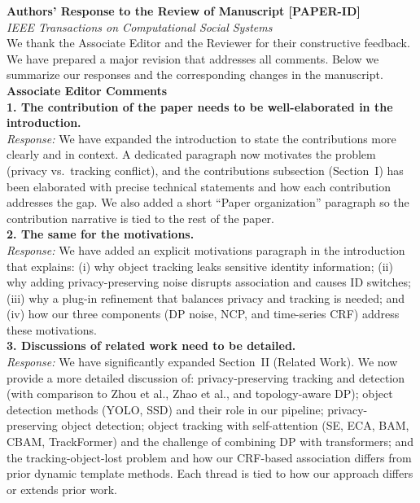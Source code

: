 \thispagestyle{plain}
\noindent\textbf{\large Authors' Response to the Review of Manuscript [PAPER-ID]}\\[0.5em]
\noindent\textit{IEEE Transactions on Computational Social Systems}\\

\vspace{0.5em}
\noindent We thank the Associate Editor and the Reviewer for their constructive feedback. We have prepared a major revision that addresses all comments. Below we summarize our responses and the corresponding changes in the manuscript.\\

\noindent\textbf{Associate Editor Comments}\\

\noindent\textbf{1. The contribution of the paper needs to be well-elaborated in the introduction.}\\
\textit{Response:} We have expanded the introduction to state the contributions more clearly and in context. A dedicated paragraph now motivates the problem (privacy vs.\ tracking conflict), and the contributions subsection (Section~I) has been elaborated with precise technical statements and how each contribution addresses the gap. We also added a short ``Paper organization'' paragraph so the contribution narrative is tied to the rest of the paper.\\

\noindent\textbf{2. The same for the motivations.}\\
\textit{Response:} We have added an explicit motivations paragraph in the introduction that explains: (i) why object tracking leaks sensitive identity information; (ii) why adding privacy-preserving noise disrupts association and causes ID switches; (iii) why a plug-in refinement that balances privacy and tracking is needed; and (iv) how our three components (DP noise, NCP, and time-series CRF) address these motivations.\\

\noindent\textbf{3. Discussions of related work need to be detailed.}\\
\textit{Response:} We have significantly expanded Section~II (Related Work). We now provide a more detailed discussion of: privacy-preserving tracking and detection (with comparison to Zhou et al., Zhao et al., and topology-aware DP); object detection methods (YOLO, SSD) and their role in our pipeline; privacy-preserving object detection; object tracking with self-attention (SE, ECA, BAM, CBAM, TrackFormer) and the challenge of combining DP with transformers; and the tracking-object-lost problem and how our CRF-based association differs from prior dynamic template methods. Each thread is tied to how our approach differs or extends prior work.\\

